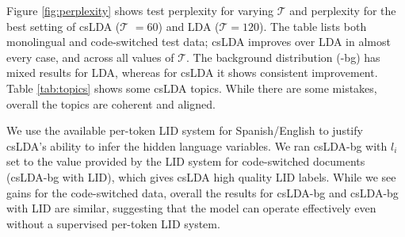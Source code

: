 \documentclass[11pt]{article}
\begin{document}
Figure \ref{fig:perplexity} shows test perplexity for varying $\mathcal{T}$ and perplexity  for the best setting of csLDA ($\mathcal{T}$
$=$$60$) and LDA ($\mathcal{T}$$=$$120$). The table lists both monolingual and code-switched test data;
csLDA improves over LDA in almost every case, and across all values of $\mathcal{T}$.
The background distribution (-bg) has mixed results for LDA, whereas for
csLDA it shows consistent improvement.
Table \ref{tab:topics} shows some csLDA topics. While there are some mistakes, overall the topics are coherent and aligned.

We use the available per-token LID system \cite{Lignos:13} for Spanish/English
to justify csLDA's ability to infer the hidden language variables. 
We ran csLDA-bg with $l_i$ set
to the value provided by the LID system for code-switched documents (csLDA-bg with LID),
which gives csLDA high quality LID labels. 
While we see gains for the code-switched data,
overall the results for csLDA-bg and csLDA-bg with LID are similar, suggesting that the model can
operate effectively even without a supervised per-token LID system.
\end{document}
